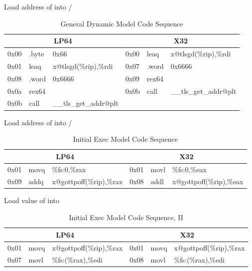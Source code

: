\begin{description}
\item[]
  Load address of  into /

\begin{table}[H]
\Hrule
\caption{General Dynamic Model Code Sequence}
\begin{center}
\code\small{
\begin{tabular}{lll|lll}
\multicolumn{3}{c}{LP64} & \multicolumn{3}{c}{X32} \\
\hline
0x00 & .byte & 0x66			& 0x00 & leaq  & x@tlsgd(\%rip),\%rdi \\
0x01 & leaq  & x@tlsgd(\%rip),\%rdi	& 0x07 & .word & 0x6666 \\
0x08 & .word & 0x6666			& 0x09 & rex64 & \\
0x0a & rex64 &				& 0x0b & call  & \_\_tls\_get\_addr@plt \\
0x0b & call  & \_\_tls\_get\_addr@plt	&      &       & \\
\end{tabular}
}
\end{center}
\Hrule
\end{table}

\item[]
  Load address of  into /

\begin{table}[H]
\Hrule
\caption{Initial Exec Model Code Sequence}
\begin{center}
\code\small{
\begin{tabular}{lll|lll}
\multicolumn{3}{c}{LP64} & \multicolumn{3}{c}{X32} \\
\hline
0x01 & movq & \%fs:0,\%rax		& 0x01 & movl & \%fs:0,\%eax \\
0x09 & addq & x@gottpoff(\%rip),\%rax	& 0x08 & addl & x@gottpoff(\%rip),\%eax \\
\end{tabular}
}
\end{center}
\Hrule
\end{table}

\item[]
  Load value of  into 

\begin{table}[H]
\Hrule
\caption{Initial Exec Model Code Sequence, II}
\begin{center}
\code\small{
\begin{tabular}{lll|lll}
\multicolumn{3}{c}{LP64} & \multicolumn{3}{c}{X32} \\
\hline
0x01 & movq & x@gottpoff(\%rip),\%rax	& 0x01 & movq & x@gottpoff(\%rip),\%rax \\
0x07 & movl & \%fs:(\%rax),\%edi	& 0x08 & movl & \%fs:(\%rax),\%edi \\
\end{tabular}
}
\end{center}
\Hrule
\end{table}

\end{description}

